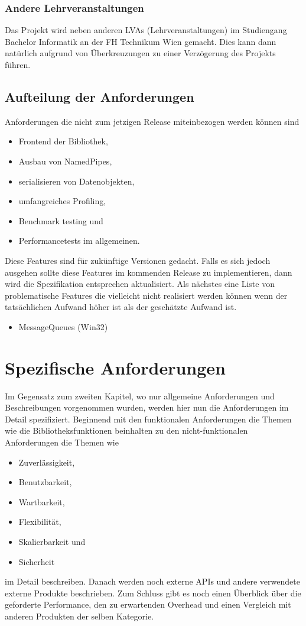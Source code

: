 \documentclass[a4paper]{book}
\begin{document}
\subsection{Andere Lehrveranstaltungen}
Das Projekt wird neben anderen LVAs (Lehrveranstaltungen) im Studiengang Bachelor Informatik an der FH Technikum Wien gemacht. Dies kann dann natürlich aufgrund von Überkreuzungen zu einer Verzögerung des Projekts führen.

\section{Aufteilung der Anforderungen}
Anforderungen die nicht zum jetzigen Release miteinbezogen werden können sind
\begin{itemize}
\item Frontend der Bibliothek,
\item Ausbau von NamedPipes,
\item serialisieren von Datenobjekten,
\item umfangreiches Profiling,
\item Benchmark testing und
\item Performancetests im allgemeinen.
\end{itemize}

Diese Features sind für zukünftige Versionen gedacht. Falls es sich jedoch ausgehen sollte diese Features im kommenden Release zu implementieren, dann wird die Spezifikation entsprechen aktualisiert. Als nächstes eine Liste von problematische Features die vielleicht nicht realisiert werden können wenn der tatsächlichen Aufwand höher ist als der geschätzte Aufwand ist.
\begin{itemize}
\item MessageQueues (Win32)
\end{itemize}

\chapter{Spezifische Anforderungen}
Im Gegensatz zum zweiten Kapitel, wo nur allgemeine Anforderungen und Beschreibungen vorgenommen wurden, werden hier nun die Anforderungen im Detail spezifiziert. Beginnend mit den funktionalen Anforderungen die Themen wie die Bibliotheksfunktionen beinhalten zu den nicht-funktionalen Anforderungen die Themen wie
\begin{itemize}
\item Zuverlässigkeit,
\item Benutzbarkeit,
\item Wartbarkeit,
\item Flexibilität,
\item Skalierbarkeit und
\item Sicherheit
\end{itemize}
im Detail beschreiben. Danach werden noch externe APIs und andere verwendete externe Produkte beschrieben. Zum Schluss gibt es noch einen Überblick über die geforderte Performance, den zu erwartenden Overhead und einen Vergleich mit anderen Produkten der selben Kategorie.
\end{document}
